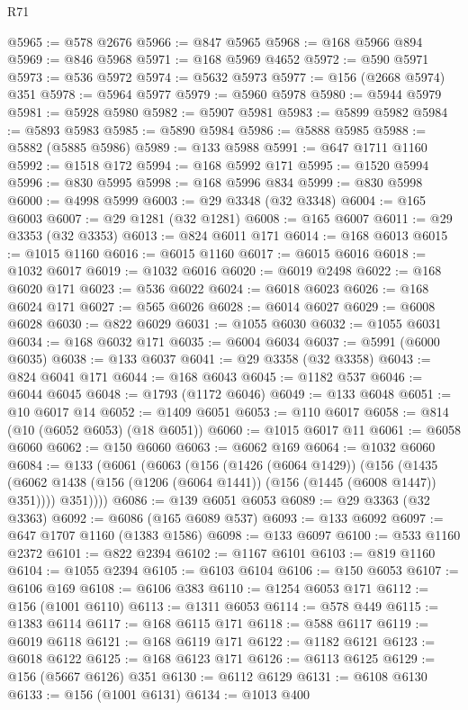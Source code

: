 \begin{lexlean}{R71}
\begin{coremodule}
@5965 := @578 @2676
@5966 := @847 @5965
@5968 := @168 @5966 @894
@5969 := @846 @5968
@5971 := @168 @5969 @4652
@5972 := @590 @5971
@5973 := @536 @5972
@5974 := @5632 @5973
@5977 := @156 (@2668 @5974) @351
@5978 := @5964 @5977
@5979 := @5960 @5978
@5980 := @5944 @5979
@5981 := @5928 @5980
@5982 := @5907 @5981
@5983 := @5899 @5982
@5984 := @5893 @5983
@5985 := @5890 @5984
@5986 := @5888 @5985
@5988 := @5882 (@5885 @5986)
@5989 := @133 @5988
@5991 := @647 @1711 @1160
@5992 := @1518 @172
@5994 := @168 @5992 @171
@5995 := @1520 @5994
@5996 := @830 @5995
@5998 := @168 @5996 @834
@5999 := @830 @5998
@6000 := @4998 @5999
@6003 := @29 @3348 (@32 @3348)
@6004 := @165 @6003
@6007 := @29 @1281 (@32 @1281)
@6008 := @165 @6007
@6011 := @29 @3353 (@32 @3353)
@6013 := @824 @6011 @171
@6014 := @168 @6013
@6015 := @1015 @1160
@6016 := @6015 @1160
@6017 := @6015 @6016
@6018 := @1032 @6017
@6019 := @1032 @6016
@6020 := @6019 @2498
@6022 := @168 @6020 @171
@6023 := @536 @6022
@6024 := @6018 @6023
@6026 := @168 @6024 @171
@6027 := @565 @6026
@6028 := @6014 @6027
@6029 := @6008 @6028
@6030 := @822 @6029
@6031 := @1055 @6030
@6032 := @1055 @6031
@6034 := @168 @6032 @171
@6035 := @6004 @6034
@6037 := @5991 (@6000 @6035)
@6038 := @133 @6037
@6041 := @29 @3358 (@32 @3358)
@6043 := @824 @6041 @171
@6044 := @168 @6043
@6045 := @1182 @537
@6046 := @6044 @6045
@6048 := @1793 (@1172 @6046)
@6049 := @133 @6048
@6051 := @10 @6017 @14
@6052 := @1409 @6051
@6053 := @110 @6017
@6058 := @814 (@10 (@6052 @6053) (@18 @6051))
@6060 := @1015 @6017 @11
@6061 := @6058 @6060
@6062 := @150 @6060
@6063 := @6062 @169
@6064 := @1032 @6060
@6084 := @133
    (@6061
      (@6063
        (@156
          (@1426 (@6064 @1429))
          (@156
            (@1435 (@6062 @1438 (@156 (@1206 (@6064 @1441)) (@156 (@1445 (@6008 @1447)) @351))))
            @351))))
@6086 := @139 @6051 @6053
@6089 := @29 @3363 (@32 @3363)
@6092 := @6086 (@165 @6089 @537)
@6093 := @133 @6092
@6097 := @647 @1707 @1160 (@1383 @1586)
@6098 := @133 @6097
@6100 := @533 @1160 @2372
@6101 := @822 @2394
@6102 := @1167 @6101
@6103 := @819 @1160
@6104 := @1055 @2394
@6105 := @6103 @6104
@6106 := @150 @6053
@6107 := @6106 @169
@6108 := @6106 @383
@6110 := @1254 @6053 @171
@6112 := @156 (@1001 @6110)
@6113 := @1311 @6053
@6114 := @578 @449
@6115 := @1383 @6114
@6117 := @168 @6115 @171
@6118 := @588 @6117
@6119 := @6019 @6118
@6121 := @168 @6119 @171
@6122 := @1182 @6121
@6123 := @6018 @6122
@6125 := @168 @6123 @171
@6126 := @6113 @6125
@6129 := @156 (@5667 @6126) @351
@6130 := @6112 @6129
@6131 := @6108 @6130
@6133 := @156 (@1001 @6131)
@6134 := @1013 @400

\end{coremodule}
\end{lexlean}
